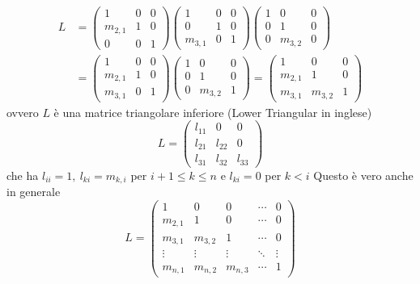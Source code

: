     \[
    \begin{split}
        L &=
        \begin{pmatrix}
        1 & 0 & 0 \\
        m_{2,1} & 1 & 0 \\
        0 & 0 & 1
        \end{pmatrix}
        \begin{pmatrix}
        1 & 0 & 0 \\
        0 & 1 & 0 \\
        m_{3,1} & 0 & 1
        \end{pmatrix}
        \begin{pmatrix}
        1 & 0 & 0 \\
        0 & 1 & 0 \\
        0 & m_{3,2} & 0
        \end{pmatrix} \\
        &=
        \begin{pmatrix}
        1 & 0 & 0 \\
        m_{2,1} & 1 & 0 \\
        m_{3,1} & 0 & 1
        \end{pmatrix}
        \begin{pmatrix}
        1 & 0 & 0 \\
        0 & 1 & 0 \\
        0 & m_{3,2} & 1
        \end{pmatrix}
        =
        \begin{pmatrix}
        1 & 0 & 0 \\
        m_{2,1} & 1 & 0 \\
        m_{3,1} & m_{3,2} & 1
        \end{pmatrix}
    \end{split}
    \]
    ovvero $L$ è una matrice triangolare inferiore (Lower Triangular in inglese)
    \[
    L =
    \begin{pmatrix}
    l_{11} & 0 & 0 \\
    l_{21} & l_{22} & 0 \\
    l_{31} & l_{32} & l_{33}
    \end{pmatrix}
    \]
    che ha $l_{ii} = 1, \ l_{ki} = m_{k,i}$ per $i+1 \le k \le n$ e $l_{ki} = 0$ per $k<i$
Questo è vero anche in generale
\[
L=
\begin{pmatrix}
1 & 0 & 0 & \cdots & 0 \\
m_{2,1} & 1 & 0 & \cdots & 0 \\
m_{3,1} & m_{3,2} & 1 & \cdots & 0 \\
\vdots & \vdots & \vdots & \ddots & \vdots \\
m_{n,1} & m_{n,2} & m_{n,3} & \cdots & 1
\end{pmatrix}
\]
